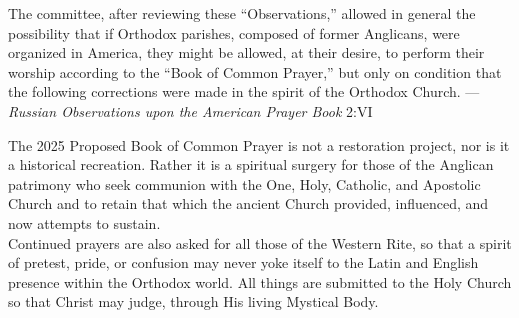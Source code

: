 \begin{quoting}\noindent
	The committee, after reviewing these ``Observations,'' allowed in general the possibility that if Orthodox parishes, composed of former Anglicans, were organized in America, they might be allowed, at their desire, to perform their worship according to the ``Book of Common Prayer,'' but only on condition that the following corrections were made in the spirit of the Orthodox Church. ---\emph{Russian Observations upon the American Prayer Book} 2:VI
\end{quoting}

The 2025 Proposed Book of Common Prayer is not a restoration project, nor is it a historical recreation. Rather it is a spiritual surgery for those of the Anglican patrimony who seek communion with the One, Holy, Catholic, and Apostolic Church and to retain that which the ancient Church provided, influenced, and now attempts to sustain.\\

Continued prayers are also asked for all those of the Western Rite, so that a spirit of pretest, pride, or confusion may never yoke itself to the Latin and English presence within the Orthodox world. All things are submitted to the Holy Church so that Christ may judge, through His living Mystical Body.\\


\vspace{1\baselineskip}



